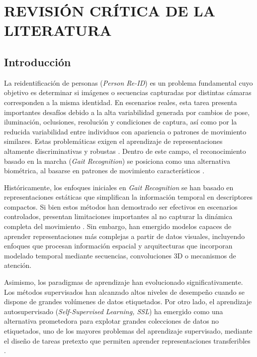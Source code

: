 \chapter{REVISIÓN CRÍTICA DE LA LITERATURA}

\section{Introducción}

La reidentificación de personas (\textit{Person Re-ID}) es un problema fundamental cuyo objetivo es determinar si imágenes o secuencias capturadas por distintas cámaras corresponden a la misma identidad. En escenarios reales, esta tarea presenta importantes desafíos debido a la alta variabilidad generada por cambios de pose, iluminación, oclusiones, resolución y condiciones de captura, así como por la reducida variabilidad entre individuos con apariencia o patrones de movimiento similares. Estas problemáticas exigen el aprendizaje de representaciones altamente discriminativas y robustas \cite{Asperti2024ReviewReID}. Dentro de este campo, el reconocimiento basado en la marcha (\textit{Gait Recognition}) se posiciona como una alternativa biométrica, al basarse en patrones de movimiento característicos \cite{Purish2023GaitRecognition}.

Históricamente, los enfoques iniciales en \textit{Gait Recognition} se han basado en representaciones estáticas que simplifican la información temporal en descriptores compactos. Si bien estos métodos han demostrado ser efectivos en escenarios controlados, presentan limitaciones importantes al no capturar la dinámica completa del movimiento \cite{Purish2023GaitRecognition}. Sin embargo, han emergido modelos capaces de aprender representaciones más complejas a partir de datos visuales, incluyendo enfoques que procesan información espacial y arquitecturas que incorporan modelado temporal mediante secuencias, convoluciones 3D o mecanismos de atención.

Asimismo, los paradigmas de aprendizaje han evolucionado significativamente. Los métodos supervisados han alcanzado altos niveles de desempeño cuando se dispone de grandes volúmenes de datos etiquetados. Por otro lado, el aprendizaje autosupervisado (\textit{Self-Supervised Learning, SSL}) ha emergido como una alternativa prometedora para explotar grandes colecciones de datos no etiquetados, uno de los mayores problemas del aprendizaje supervisado, mediante el diseño de tareas pretexto que permiten aprender representaciones transferibles \cite{Liu2023GaitBenchmark}.

